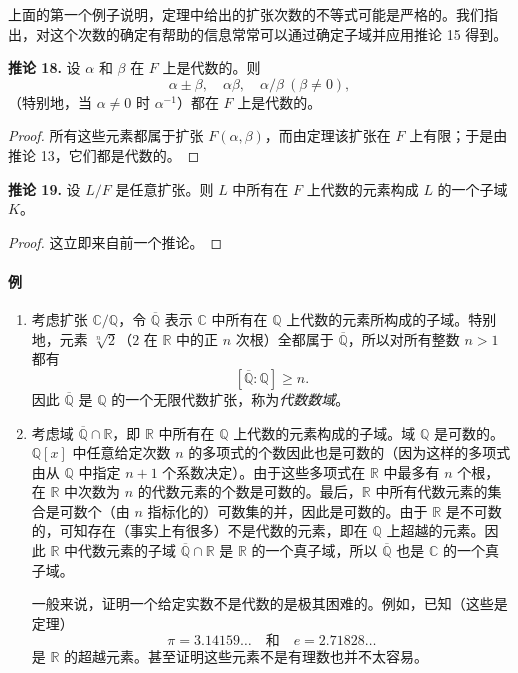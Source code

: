 上面的第一个例子说明，定理中给出的扩张次数的不等式可能是严格的。我们指出，对这个次数的确定有帮助的信息常常可以通过确定子域并应用推论 15 得到。

\noindent\textbf{推论 18.} 设 $\alpha$ 和 $\beta$ 在 $F$ 上是代数的。则
\[
\alpha\pm\beta,
\quad \alpha\beta,
\quad \alpha/\beta\ (\beta\neq0),
\]
（特别地，当 $\alpha\neq0$ 时 $\alpha^{-1}$）都在 $F$ 上是代数的。

\begin{proof}
	所有这些元素都属于扩张 $F(\alpha,\beta)$，而由定理该扩张在 $F$ 上有限；于是由推论 13，它们都是代数的。
\end{proof}

\noindent\textbf{推论 19.} 设 $L/F$ 是任意扩张。则 $L$ 中所有在 $F$ 上代数的元素构成 $L$ 的一个子域 $K$。

\begin{proof}
	这立即来自前一个推论。
\end{proof}

\paragraph{例}
\begin{enumerate}[label=(\arabic*)]
	\item 考虑扩张 $\mathbb C/\mathbb Q$，令 $\overline{\mathbb Q}$ 表示 $\mathbb C$ 中所有在 $\mathbb Q$ 上代数的元素所构成的子域。特别地，元素 $\sqrt[n]{2}$（$2$ 在 $\mathbb R$ 中的正 $n$ 次根）全都属于 $\overline{\mathbb Q}$，所以对所有整数 $n>1$ 都有
	\[
	[\overline{\mathbb Q}:\mathbb Q]\geq n.
	\]
	因此 $\overline{\mathbb Q}$ 是 $\mathbb Q$ 的一个无限代数扩张，称为\emph{代数数域}。
	\item 考虑域 $\overline{\mathbb Q}\cap\mathbb R$，即 $\mathbb R$ 中所有在 $\mathbb Q$ 上代数的元素构成的子域。域 $\mathbb Q$ 是可数的。$\mathbb Q[x]$ 中任意给定次数 $n$ 的多项式的个数因此也是可数的（因为这样的多项式由从 $\mathbb Q$ 中指定 $n+1$ 个系数决定）。由于这些多项式在 $\mathbb R$ 中最多有 $n$ 个根，在 $\mathbb R$ 中次数为 $n$ 的代数元素的个数是可数的。最后，$\mathbb R$ 中所有代数元素的集合是可数个（由 $n$ 指标化的）可数集的并，因此是可数的。由于 $\mathbb R$ 是不可数的，可知存在（事实上有很多）不是代数的元素，即在 $\mathbb Q$ 上超越的元素。因此 $\mathbb R$ 中代数元素的子域 $\overline{\mathbb Q}\cap\mathbb R$ 是 $\mathbb R$ 的一个真子域，所以 $\overline{\mathbb Q}$ 也是 $\mathbb C$ 的一个真子域。
	
	一般来说，证明一个给定实数不是代数的是极其困难的。例如，已知（这些是定理）
	\[
	\pi=3.14159\ldots
	\quad\text{和}\quad
	e=2.71828\ldots
	\]
	是 $\mathbb R$ 的超越元素。甚至证明这些元素不是有理数也并不太容易。
\end{enumerate}


